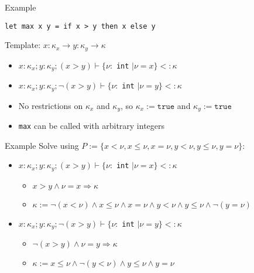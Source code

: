 \documentclass[pdf]{beamer}
\begin{document}
\begin{frame}[fragile]{Example}
  \begin{verbatim}
let max x y = if x > y then x else y
  \end{verbatim}
  Template: $x: \kappa_x \rightarrow y: \kappa_y \rightarrow \kappa$
  \pause
  \begin{itemize}
    \item<+->[1)] $x: \kappa_x; y: \kappa_y; (x > y) \vdash \{\nu:$ \texttt{int} $\mid \nu = x \} <: \kappa$
    \item<+->[2)] $x: \kappa_x; y: \kappa_y; \neg(x > y) \vdash \{\nu:$ \texttt{int} $\mid \nu = y \} <: \kappa$
  \end{itemize}
  \begin{itemize}
    \item<+-> No restrictions on $\kappa_x$ and $\kappa_y$, so $\kappa_x := \mathtt{true}$ and $\kappa_y := \mathtt{true}$
    \item<+-> \texttt{max} can be called with arbitrary integers
  \end{itemize}
\end{frame}

\begin{frame}{Example}
  Solve using $P := \{x < \nu, x \le \nu, x = \nu, y < \nu, y \le \nu, y = \nu\}$:
  \begin{itemize}
    \item<+->[1)] $x: \kappa_x; y: \kappa_y; (x > y) \vdash \{\nu:$ \texttt{int} $\mid \nu = x \} <: \kappa$
      \begin{itemize}
        \item<+-> $x > y \land \nu = x \Rightarrow \kappa$
        \item<+-> $\kappa := \neg(x < \nu) \land x \le \nu \land x = \nu \land y < \nu \land y \le \nu \land \neg(y = \nu)$
      \end{itemize}
    \item<+->[2)] $x: \kappa_x; y: \kappa_y; \neg(x > y) \vdash \{\nu:$ \texttt{int} $\mid \nu = y \} <: \kappa$
      \begin{itemize}
        \item<+-> $\neg(x > y) \land \nu = y \Rightarrow \kappa$
        \item<+-> $\kappa := x \le \nu \land \neg(y < \nu) \land y \le \nu \land y = \nu$
      \end{itemize}
  \end{itemize}
  \\
  \vspace{3ex}
\end{frame}
\end{document}

